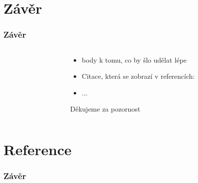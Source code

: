 \documentclass[notes=false,pdftex]{beamer}
\begin{document}
\section{Závěr}
\begin{frame}
	\frametitle{Závěr}

	\begin{columns}[T]
		\begin{column}{0.5\textwidth}
		\end{column}
		\begin{column}{0.5\textwidth}
			\begin{itemize}
				\item body k tomu, co by šlo udělat lépe\pause
				\item Citace, která se zobrazí v referencích: \cite{Wurm2008Coordinated}
				\item ...
			\end{itemize}
			\pause
			\vspace{13ex}\hspace*{\fill}Děkujeme za pozornost
		\end{column}
	\end{columns}

\end{frame}

\section{Reference}
\begin{frame}
	\frametitle{Závěr}

	
	
	
\end{frame}
\end{document}
